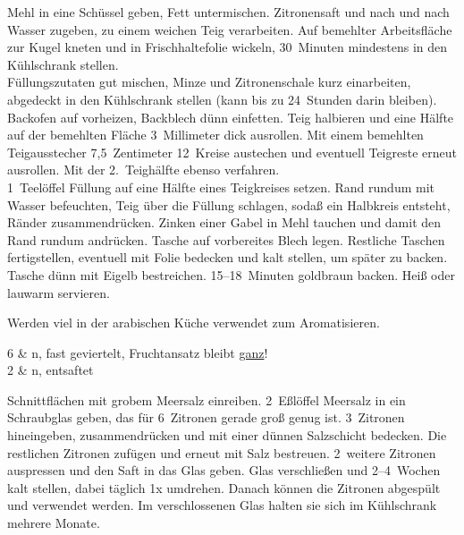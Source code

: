       \begin{zubereitung}
        Mehl in eine Schüssel geben, Fett untermischen. Zitronensaft und nach
	und nach Wasser zugeben, zu einem weichen Teig verarbeiten. Auf
	bemehlter Arbeitsfläche zur Kugel kneten und in Frischhaltefolie
	wickeln, 30~Minuten mindestens in den Kühlschrank stellen. \\
	Füllungszutaten gut mischen, Minze und Zitronenschale kurz einarbeiten,
	abgedeckt in den Kühlschrank stellen (kann bis zu 24~Stunden darin
	bleiben). \\
	Backofen auf  vorheizen, Backblech dünn einfetten. Teig
	halbieren und eine Hälfte auf der bemehlten Fläche 3~Millimeter dick
	ausrollen. Mit einem bemehlten Teigausstecher \durchmesser{}
	7,5~Zentimeter 12~Kreise austechen und eventuell Teigreste erneut
	ausrollen. Mit der 2.~Teighälfte ebenso verfahren. \\
	1~Teelöffel Füllung auf eine Hälfte eines Teigkreises setzen. Rand
	rundum mit Wasser befeuchten, Teig über die Füllung schlagen, sodaß
	ein Halbkreis entsteht, Ränder zusammendrücken. Zinken einer Gabel in
	Mehl tauchen und damit den Rand rundum andrücken. Tasche auf vorbereites
	Blech legen. Restliche Taschen fertigstellen, eventuell mit Folie
	bedecken und kalt stellen, um später zu backen. \\
	Tasche dünn mit Eigelb bestreichen. 15--18~Minuten goldbraun backen.
	Heiß oder lauwarm servieren. \\
      \end{zubereitung}


    \label{eingemachtezitronen}

      \begin{einleitung}
        Werden viel in der arabischen Küche verwendet zum Aromatisieren. \\
      \end{einleitung}

      \begin{zutaten}
        6 & n, fast geviertelt, Fruchtansatz bleibt
	    \underline{ganz}! \\
	2 & n, entsaftet
      \end{zutaten}

      \begin{zubereitung}
        Schnittflächen mit grobem Meersalz einreiben. 2~Eßlöffel Meersalz in ein
	Schraubglas geben, das für 6~Zitronen gerade groß genug ist. 3~Zitronen
	hineingeben, zusammendrücken und mit einer dünnen Salzschicht bedecken.
	Die restlichen Zitronen zufügen und erneut mit Salz bestreuen.
	2~weitere Zitronen auspressen und den Saft in das Glas geben. Glas
	verschließen und 2--4~Wochen kalt stellen, dabei täglich 1x umdrehen.
	Danach können die Zitronen abgespült und verwendet werden. Im
	verschlossenen Glas halten sie sich im Kühlschrank mehrere Monate. \\
      \end{zubereitung}


